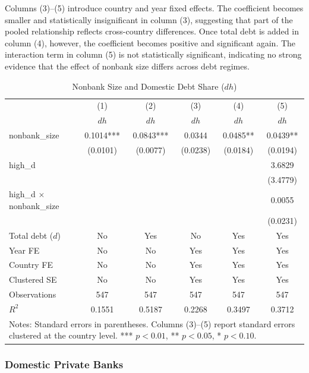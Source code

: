 \documentclass[\latexroot/\projectname]{subfiles}
\begin{document}
Columns (3)--(5) introduce country and year fixed effects. The coefficient becomes smaller and statistically insignificant in column (3), suggesting that part of the pooled relationship reflects cross-country differences. Once total debt is added in column (4), however, the coefficient becomes positive and significant again. The interaction term in column (5) is not statistically significant, indicating no strong evidence that the effect of nonbank size differs across debt regimes.

\begin{table}[htbp]\centering
\caption{Nonbank Size and Domestic Debt Share ($dh$)}
\label{tab:nonbank}
\begin{tabular}{lccccc}
\toprule
 & (1) & (2) & (3) & (4) & (5) \\
 & $dh$ & $dh$ & $dh$ & $dh$ & $dh$ \\
\midrule
nonbank\_size 
& 0.1014*** & 0.0843*** & 0.0344 & 0.0485** & 0.0439** \\
& (0.0101) & (0.0077) & (0.0238) & (0.0184) & (0.0194) \\

high\_d
&  &  &  &  & 3.6829 \\
&  &  &  &  & (3.4779) \\

high\_d $\times$ nonbank\_size
&  &  &  &  & 0.0055 \\
&  &  &  &  & (0.0231) \\

\midrule
Total debt ($d$) & No & Yes & No & Yes & Yes \\
Year FE          & No & No  & Yes & Yes & Yes \\
Country FE       & No & No  & Yes & Yes & Yes \\
Clustered SE     & No & No  & Yes & Yes & Yes \\

\midrule
Observations & 547 & 547 & 547 & 547 & 547 \\
$R^2$        & 0.1551 & 0.5187 & 0.2268 & 0.3497 & 0.3712 \\
\bottomrule
\multicolumn{6}{p{0.92\linewidth}}{\footnotesize Notes: Standard errors in parentheses. Columns (3)--(5) report standard errors clustered at the country level. *** $p<0.01$, ** $p<0.05$, * $p<0.10$.}
\end{tabular}
\end{table}

\subsubsection{Domestic Private Banks}
\end{document}
